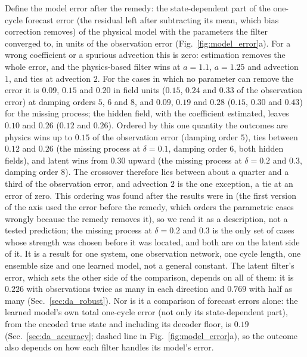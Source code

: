  Define the model error after the remedy: the state-dependent part of the
one-cycle forecast error (the residual left after subtracting its mean, which bias correction removes) of the
physical model with the parameters the filter converged to, in units of the observation error
(Fig.~\ref{fig:model_error}a). For a wrong coefficient or a spurious advection this is zero: estimation
removes the whole error, and the physics-based filter wins at $a=1.1$, $a=1.25$ and advection $1$, and ties
at advection $2$. For the cases in which no parameter can remove the error it is
$0.09$, $0.15$ and $0.20$ in field units ($0.15$, $0.24$ and $0.33$ of the observation error) at damping
orders $5$, $6$ and $8$, and $0.09$, $0.19$ and $0.28$ ($0.15$, $0.30$ and $0.43$) for the missing process;
the hidden field, with the coefficient estimated, leaves $0.10$ and $0.26$ ($0.12$ and $0.26$). Ordered by
this one quantity the outcomes are physics wins up to $0.15$ of the observation error (damping order $5$),
ties between $0.12$ and $0.26$ (the missing process at $\delta=0.1$, damping order $6$, both hidden fields),
and latent wins from $0.30$ upward (the missing process at $\delta=0.2$ and $0.3$, damping order $8$).
The crossover therefore lies between about a quarter and a third of the observation error, and advection
$2$ is the one exception, a tie at an error of zero. This ordering was found after the results were in
(the first version of the axis used the error before the remedy, which orders the parametric cases
wrongly because the remedy removes it), so we read it as a description, not a tested prediction; the
missing process at $\delta=0.2$ and $0.3$ is the only set of cases whose strength was chosen before it
was located, and both are on the latent side of it. It is a result for one system, one observation network, one cycle
length, one ensemble size and one learned model, not a general constant. The latent filter's error,
which sets the other side of the comparison, depends on all of them: it is $0.226$ with observations
twice as many in each direction and $0.769$ with half as many (Sec.~\ref{sec:da_robust}). Nor is it a
comparison of forecast errors alone: the learned model's own total one-cycle error (not only its
state-dependent part), from the encoded true state and including its decoder floor, is $0.19$
(Sec.~\ref{sec:da_accuracy}; dashed line in Fig.~\ref{fig:model_error}a), so the outcome also depends on
how each filter handles its model's error.

